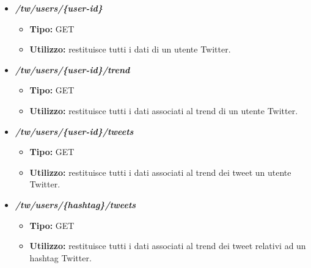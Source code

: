 \begin{itemize}
  \item \textit{\textbf{/tw/users/\{user-id\}}}
  \begin{itemize}
    \item \textbf{Tipo:} GET
    \item \textbf{Utilizzo:} restituisce tutti i dati di un utente Twitter.
  \end{itemize}
  \item \textit{\textbf{/tw/users/\{user-id\}/trend}}
  \begin{itemize}
    \item \textbf{Tipo:} GET
    \item \textbf{Utilizzo:} restituisce tutti i dati associati al trend di un utente Twitter.
  \end{itemize}
  \item \textit{\textbf{/tw/users/\{user-id\}/tweets}}
  \begin{itemize}
    \item \textbf{Tipo:} GET
    \item \textbf{Utilizzo:} restituisce tutti i dati associati al trend dei tweet un utente Twitter.
  \end{itemize}
  \item \textit{\textbf{/tw/users/\{hashtag\}/tweets}}
  \begin{itemize}
    \item \textbf{Tipo:} GET
    \item \textbf{Utilizzo:} restituisce tutti i dati associati al trend dei tweet relativi ad un hashtag Twitter.
  \end{itemize}


\end{itemize}
